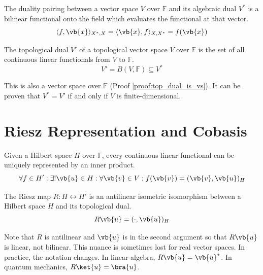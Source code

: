 \begin{definition}
	The duality pairing between a vector space $V$ over $\mathbb{F}$ and its algebraic dual $V^{*}$ is a bilinear functional onto the field which evaluates the functional at that vector.
	\begin{equation}
		\langle f, \vb{x} \rangle_{X^{*}, X} = \langle \vb{x}, f \rangle_{X, X^{*}} = f(\vb{x})
	\end{equation}
\end{definition}

\begin{definition}
The topological dual $V'$ of a topological vector space $V$ over $\mathbb{F}$ is the set of all continuous linear functionals from $V$ to $\mathbb{F}$.
\begin{equation}
	V' = B(V, \mathbb{F}) \subseteq V^{*}
\end{equation}
\end{definition}

This is also a vector space over $\mathbb{F}$ (Proof \ref{proof:top_dual_is_vs}). It can be proven that $V^{*} = V'$ if and only if $V$ is finite-dimensional.

\section{Riesz Representation and Cobasis}

\begin{theorem}
	Given a Hilbert space $H$ over $\mathbb{F}$, every continuous linear functional can be uniquely represented by an inner product.
	\begin{equation}
		\forall f \in H': \exists! \vb{u} \in H: \forall \vb{v} \in V: f(\vb{v}) = (\vb{v}, \vb{u})_{H}
	\end{equation}
\end{theorem}

\begin{definition}
	The Riesz map $R: H \leftrightarrow H'$ is an antilinear isometric isomorphism between a Hilbert space $H$ and its topological dual.
	\begin{equation}
		R \vb{u} = (\cdot, \vb{u})_{H}
	\end{equation}
\end{definition}

Note that $R$ is antilinear and $\vb{u}$ is in the second argument so that $R \vb{u}$ is linear, not bilinear. This nuance is sometimes lost for real vector spaces. In practice, the notation changes. In linear algebra, $R \vb{u} = \vb{u}^{*}$. In quantum mechanics, $R \ket{u} = \bra{u}$.

